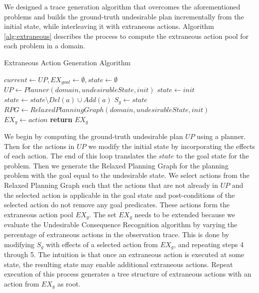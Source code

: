  
We designed a trace generation algorithm that overcomes the aforementioned problems and builds the ground-truth undesirable plan incrementally from the initial state, while interleaving it with extraneous actions.
Algorithm \ref{alg:extraneous} describes the process to compute the extraneous action pool for each problem in a domain.
\begin{algorithm}
    \caption{Extraneous Action Generation Algorithm}
    \label{alg:extraneous}
    \begin{algorithmic}[1]
        	\State $current\gets UP, EX_{goal}\gets \emptyset, state \gets \emptyset$
        	\State $UP\gets Planner(domain,undesirableState,init)$
        	\State $state \gets init$
        		\State $state\gets state\setminus Del(a)\cup Add(a)$
        		\EndIf
        	\EndFor
        	\State $S_{g}\gets state$
        	\State $RPG \gets RelaxedPlanningGraph(domain,undesirableState,init)$
				\State $EX_{g} \gets action$
				\EndIf        	        	
           	\EndFor
            \State \textbf{return} $EX_{g}$
        \EndProcedure
    \end{algorithmic}
\end{algorithm}
We begin by computing the ground-truth undesirable plan $UP$ using a planner. 
Then for the actions in $UP$ we modify the initial state by incorporating the effects of each action. 
The end of this loop translates the $state$ to the goal state for the problem. 
Then we generate the Relaxed Planning Graph for the planning problem with the goal equal to the undesirable state.
We select actions from the Relaxed Planning Graph such that the actions that are not already in $UP$ and the selected action is applicable in the goal state and post-conditions of the selected action do not remove any goal predicates. 
These actions form the extraneous action pool $EX_{g}$.
The set $EX_{g}$ needs to be extended because we evaluate the Undesirable Consequence Recognition algorithm by varying the percentage of extraneous actions in the observation trace.
This is done by modifying $S_{g}$ with effects of a selected action from $EX_{g}$, and repeating steps 4 through 5. 
The intuition is that once an extraneous action is executed at some state, the resulting state may enable additional extraneous actions. 
Repeat execution of this process generates a tree structure of extraneous actions with an action from $EX_{g}$ as root. 

